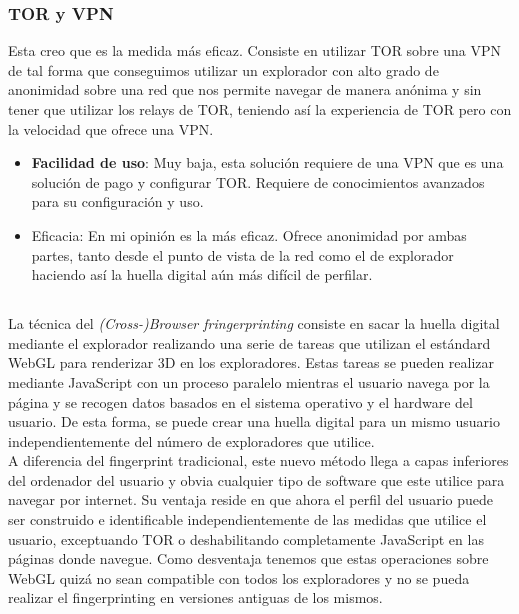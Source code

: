 \documentclass[10pt,a4paper]{article}
\begin{document}
\subsubsection*{TOR y VPN}
Esta creo que es la medida más eficaz. Consiste en utilizar TOR sobre una VPN de tal forma que conseguimos utilizar un explorador con alto grado de anonimidad sobre una red que nos permite navegar de manera anónima y sin tener que utilizar los relays de TOR, teniendo así la experiencia de TOR pero con la velocidad que ofrece una VPN.\\

\begin{itemize}
\item \textbf{Facilidad de uso}: Muy baja, esta solución requiere de una VPN que es una solución de pago y configurar TOR. Requiere de conocimientos avanzados para su configuración y uso.\\
\item Eficacia: En mi opinión es la más eficaz. Ofrece anonimidad por ambas partes, tanto desde el punto de vista de la red como el de explorador haciendo así la huella digital aún más difícil de perfilar.
\end{itemize}

\subsection{}
La técnica del \textit{(Cross-)Browser fringerprinting} consiste en sacar la huella digital mediante el explorador realizando una serie de tareas que utilizan el estándard WebGL para renderizar 3D en los exploradores. Estas tareas se pueden realizar mediante JavaScript con un proceso paralelo mientras el usuario navega por la página y se recogen datos basados en el sistema operativo y el hardware del usuario. De esta forma, se puede crear una huella digital para un mismo usuario independientemente del número de exploradores que utilice.\\  

A diferencia del fingerprint tradicional, este nuevo método llega a capas inferiores del ordenador del usuario y obvia cualquier tipo de software que este utilice para navegar por internet. Su ventaja reside en que ahora el perfil del usuario puede ser construido e identificable independientemente de las medidas que utilice el usuario, exceptuando TOR o deshabilitando completamente JavaScript en las páginas donde navegue. Como desventaja tenemos que estas operaciones sobre WebGL quizá no sean compatible con todos los exploradores y no se pueda realizar el fingerprinting en versiones antiguas de los mismos.
\end{document}

